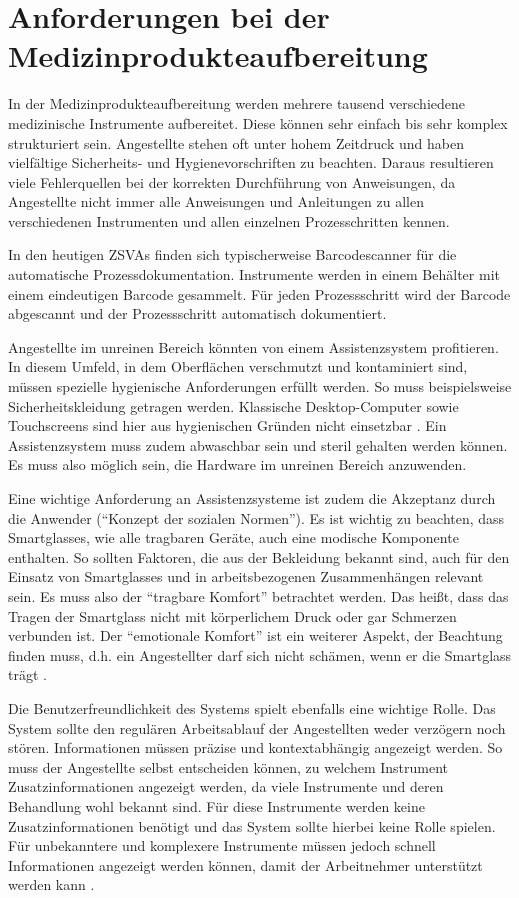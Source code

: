 \section{Anforderungen bei der Medizinprodukteaufbereitung}
\label{sec:Anforderungen_bei_der_Medizinprodukteaufbereitung}
In der Medizinprodukteaufbereitung werden mehrere tausend verschiedene medizinische Instrumente aufbereitet. Diese können sehr einfach bis sehr komplex strukturiert sein. Angestellte stehen oft unter hohem Zeitdruck und haben  vielfältige Sicherheits- und Hygienevorschriften zu beachten. Daraus resultieren viele Fehlerquellen bei der korrekten Durchführung von Anweisungen, da Angestellte nicht immer alle Anweisungen und Anleitungen zu allen verschiedenen Instrumenten und allen einzelnen Prozesschritten kennen.

In den heutigen ZSVAs finden sich typischerweise Barcodescanner für die automatische Prozessdokumentation. Instrumente werden in einem Behälter mit einem eindeutigen Barcode gesammelt. Für jeden Prozessschritt wird der Barcode abgescannt und der Prozessschritt automatisch dokumentiert.

Angestellte im unreinen Bereich könnten von einem Assistenzsystem profitieren. 
In diesem Umfeld, in dem Oberflächen verschmutzt und kontaminiert sind, müssen spezielle hygienische Anforderungen erfüllt werden. So muss beispielsweise Sicherheitskleidung getragen werden. Klassische Desktop-Computer sowie Touchscreens sind hier aus hygienischen Gründen nicht einsetzbar \cite[S.~28]{Ruther2014}. Ein Assistenzsystem muss zudem abwaschbar sein und steril gehalten werden können. Es muss also möglich sein, die Hardware im unreinen Bereich anzuwenden. 

Eine wichtige Anforderung an Assistenzsysteme ist zudem die Akzeptanz durch die Anwender (\enquote{Konzept der sozialen Normen}). Es ist wichtig zu beachten, dass Smartglasses, wie alle tragbaren Geräte, auch eine modische Komponente enthalten. So sollten Faktoren, die aus der Bekleidung bekannt sind, auch für den Einsatz von Smartglasses und in arbeitsbezogenen Zusammenhängen relevant sein. Es muss also der \enquote{tragbare Komfort} betrachtet werden. Das heißt, dass das Tragen der Smartglass nicht mit körperlichem Druck oder gar Schmerzen verbunden ist.  Der \enquote{emotionale Komfort} ist ein weiterer Aspekt, der Beachtung finden muss, d.h. ein Angestellter darf sich nicht schämen, wenn er die Smartglass trägt \cite{Hein2016}.

Die Benutzerfreundlichkeit des Systems spielt ebenfalls eine wichtige Rolle. Das System sollte den regulären Arbeitsablauf der Angestellten weder verzögern noch stören. Informationen müssen präzise und kontextabhängig angezeigt werden. So muss der Angestellte selbst entscheiden können, zu welchem Instrument Zusatzinformationen angezeigt werden, da viele Instrumente und deren Behandlung wohl bekannt sind. Für diese Instrumente werden keine Zusatzinformationen benötigt und das System sollte hierbei keine Rolle spielen. Für unbekanntere und komplexere Instrumente müssen jedoch schnell Informationen angezeigt werden können, damit der Arbeitnehmer unterstützt werden kann \cite[S.~29]{Ruther2014}.
%
%
%
%
%
%
